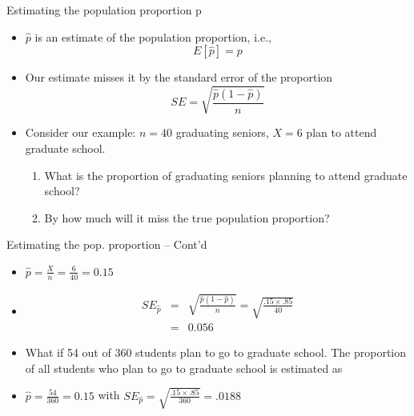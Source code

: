 \documentclass[14pt]{beamer}\usepackage[]{graphicx}\usepackage[]{color}
\begin{document}
\begin{frame}[fragile]{Estimating the population proportion p}

\begin{itemize}
\item<1-> $\hat{p}$ is an estimate of the population proportion, i.e.,
\begin{equation*}
E[ \hat{p} ] = p
\end{equation*}

\item<2-> Our estimate misses it by the standard error of the proportion
\begin{equation*}
SE = \sqrt{ \frac{ \hat{p} (1 - \hat{p})}{n}}
\end{equation*}

\item<3-> Consider our example: $n = 40$ graduating seniors, $X = 6$ plan to  attend graduate school.

\begin{enumerate}[1]
  \item<4-> What is the proportion of graduating seniors planning to attend  graduate school?
  \item<5-> By how much will it miss the true population proportion?
\end{enumerate}
\end{itemize}
\end{frame}

\begin{frame}[fragile]{Estimating the pop. proportion -- Cont'd}

{\small{
\begin{itemize}
\item<1-> $\hat{p} = \frac{X}{n} = \frac{6}{40} = 0.15$

\item<2-> 
\begin{eqnarray*}
SE_{\hat{p}} &=& \sqrt{ \frac{\hat{p} (1 - \hat{p})}{n}} 
= \sqrt{ \frac{.15 \times .85}{40}} \\
&=& 0.056 
\end{eqnarray*}

\item<3-> What if 54 out of 360 students plan to go to graduate school. The  proportion of all students who plan to go to graduate school is  estimated as

\item<4-> $\hat{p} = \frac{54}{360} = 0.15$ with $SE_{\hat{p}} = \sqrt{ \frac{.15 \times .85}{360}} = .0188$

\end{itemize}
}}
\end{frame}
\end{document}
